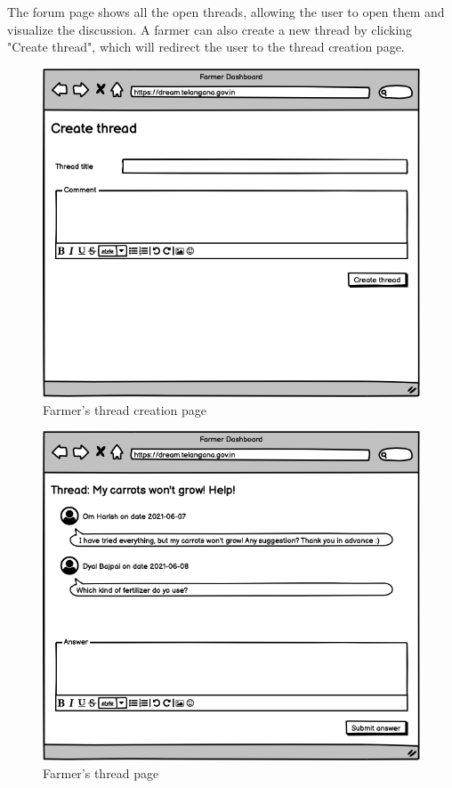 \documentclass[10pt]{article} %
\begin{document}
The forum page shows all the open threads, allowing the user to open them and visualize the discussion.
A farmer can also create a new thread by clicking "Create thread", which will redirect the user to the thread creation page.\\
\begin{figure}[h]
    \centering
    \includegraphics[scale=0.4]{images/uimockups/f_forumcreatethread.png}
    \caption{Farmer's thread creation page}
    \label{fig:ui_f_forumcreatethread}
\end{figure}
\begin{figure}[h]
    \centering
    \includegraphics[scale=0.4]{images/uimockups/f_forumthread.png}
    \caption{Farmer's thread page}
    \label{fig:ui_f_forumthread}
\end{figure}
\end{document}
